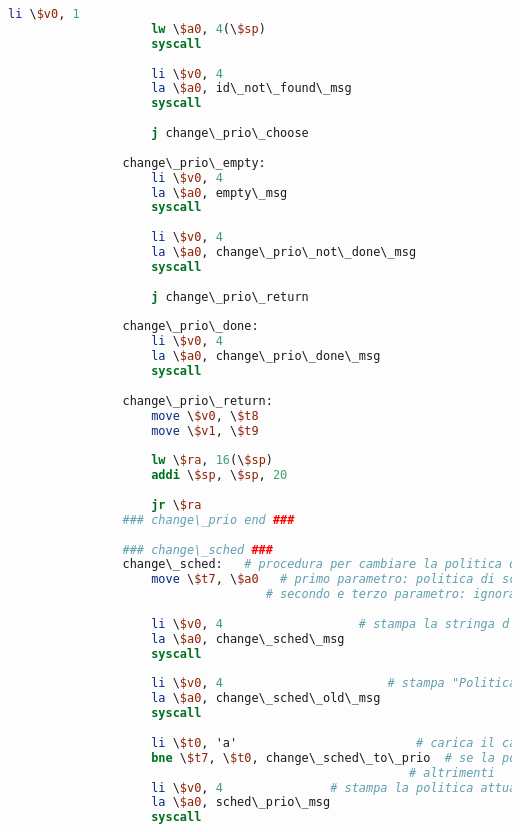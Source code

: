 \begin{center}
\begin{lstlisting}[language=mips, gobble=14, stepnumber=1]
                    li \$v0, 1
                    lw \$a0, 4(\$sp)
                    syscall
                    
                    li \$v0, 4
                    la \$a0, id\_not\_found\_msg
                    syscall
                    
                    j change\_prio\_choose
                    
                change\_prio\_empty:
                    li \$v0, 4
                    la \$a0, empty\_msg
                    syscall
                    
                    li \$v0, 4
                    la \$a0, change\_prio\_not\_done\_msg
                    syscall
                    
                    j change\_prio\_return
                    
                change\_prio\_done:
                    li \$v0, 4
                    la \$a0, change\_prio\_done\_msg
                    syscall
                
                change\_prio\_return:
                    move \$v0, \$t8
                    move \$v1, \$t9
                    
                    lw \$ra, 16(\$sp)
                    addi \$sp, \$sp, 20
                    
                    jr \$ra
                ### change\_prio end ###
                
                ### change\_sched ###
                change\_sched:   # procedura per cambiare la politica di scheduling
                    move \$t7, \$a0   # primo parametro: politica di scheduling attuale
                                    # secondo e terzo parametro: ignorati
                    
                    li \$v0, 4                   # stampa la stringa d'inizio del cambio della politica di scheduling
                    la \$a0, change\_sched\_msg
                    syscall
                    
                    li \$v0, 4                       # stampa "Politica di scheduling attuale:"
                    la \$a0, change\_sched\_old\_msg
                    syscall
                    
                    li \$t0, 'a'                         # carica il carattere 'a'
                    bne \$t7, \$t0, change\_sched\_to\_prio  # se la politica di scheduling attuale non è A, viene cambiata ad A
                                                        # altrimenti
                    li \$v0, 4               # stampa la politica attuale (su PRIORITÀ)
                    la \$a0, sched\_prio\_msg
                    syscall
                    

\end{lstlisting}
\end{center}
